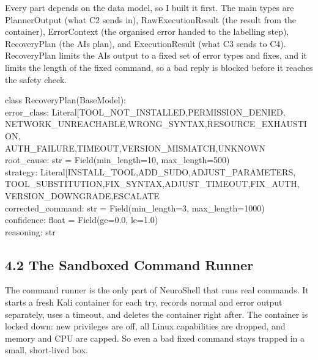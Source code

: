 \documentclass[
]{article}
\begin{document}
Every part depends on the data model, so I built it first. The main
types are PlannerOutput (what C2 sends in), RawExecutionResult (the
result from the container), ErrorContext (the organised error handed to
the labelling step), RecoveryPlan (the AI\textquotesingle s plan), and
ExecutionResult (what C3 sends to C4). RecoveryPlan limits the
AI\textquotesingle s output to a fixed set of error types and fixes, and
it limits the length of the fixed command, so a bad reply is blocked
before it reaches the safety check.

class RecoveryPlan(BaseModel):\\
error\_class:
Literal{[}\textquotesingle TOOL\_NOT\_INSTALLED\textquotesingle,\textquotesingle PERMISSION\_DENIED\textquotesingle,\\
\textquotesingle NETWORK\_UNREACHABLE\textquotesingle,\textquotesingle WRONG\_SYNTAX\textquotesingle,\textquotesingle RESOURCE\_EXHAUSTION\textquotesingle,\\
\textquotesingle AUTH\_FAILURE\textquotesingle,\textquotesingle TIMEOUT\textquotesingle,\textquotesingle VERSION\_MISMATCH\textquotesingle,\textquotesingle UNKNOWN\textquotesingle{]}\\
root\_cause: str = Field(min\_length=10, max\_length=500)\\
strategy:
Literal{[}\textquotesingle INSTALL\_TOOL\textquotesingle,\textquotesingle ADD\_SUDO\textquotesingle,\textquotesingle ADJUST\_PARAMETERS\textquotesingle,\\
\textquotesingle TOOL\_SUBSTITUTION\textquotesingle,\textquotesingle FIX\_SYNTAX\textquotesingle,\textquotesingle ADJUST\_TIMEOUT\textquotesingle,\textquotesingle FIX\_AUTH\textquotesingle,\\
\textquotesingle VERSION\_DOWNGRADE\textquotesingle,\textquotesingle ESCALATE\textquotesingle{]}\\
corrected\_command: str = Field(min\_length=3, max\_length=1000)\\
confidence: float = Field(ge=0.0, le=1.0)\\
reasoning: str

\hypertarget{the-sandboxed-command-runner}{%
\subsection{4.2 The Sandboxed Command
Runner}\label{the-sandboxed-command-runner}}

The command runner is the only part of NeuroShell that runs real
commands. It starts a fresh Kali container for each try, records normal
and error output separately, uses a timeout, and deletes the container
right after. The container is locked down: new privileges are off, all
Linux capabilities are dropped, and memory and CPU are capped. So even a
bad fixed command stays trapped in a small, short-lived box.
\end{document}
